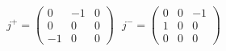 \begin{equation}
j^+=\left(\begin{array}{ccc}
0&-1&0\\
0&0&0\\
-1&0&0\end{array}\right)
~~~
j^-=\left(\begin{array}{ccc}
0&0&-1\\
1&0&0\\
0&0&0\end{array}\right)
\end{equation}

